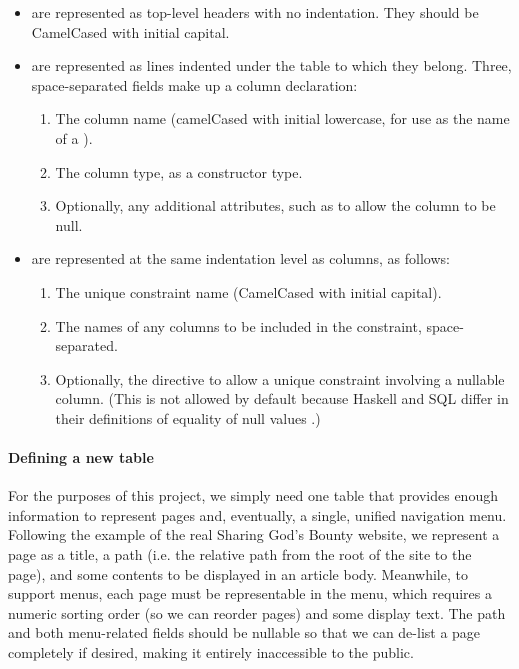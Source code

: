 \begin{itemize}
  \item {} are represented as top-level headers with no indentation. They should be CamelCased with initial capital.
  \item {} are represented as lines indented under the table to which they belong. Three, space-separated fields make up a column declaration: 
  \begin{enumerate}
    \item The column name (camelCased with initial lowercase, for use as the name of a ).
    \item The column type, as a  constructor type.
    \item Optionally, any additional attributes, such as  to allow the column to be null.
  \end{enumerate}
  \item {} are represented at the same indentation level as columns, as follows:
  \begin{enumerate}
    \item The unique constraint name (CamelCased with initial capital).
    \item The names of any columns to be included in the constraint, space-separated.
    \item Optionally, the  directive to allow a unique constraint involving a nullable column. (This is not allowed by default because Haskell and SQL differ in their definitions of equality of null values \cite{ybkPersistent}.)
  \end{enumerate}
\end{itemize}

\paragraph{Defining a new table}

For the purposes of this project, we simply need one table that provides enough information to represent pages and, eventually, a single, unified navigation menu. Following the example of the real Sharing God's Bounty website, we represent a page as a title, a path (i.e. the relative path from the root of the site to the page), and some contents to be displayed in an article body. Meanwhile, to support menus, each page must be representable in the menu, which requires a numeric sorting order (so we can reorder pages) and some display text. The path and both menu-related fields should be nullable so that we can de-list a page completely if desired, making it entirely inaccessible to the public.

